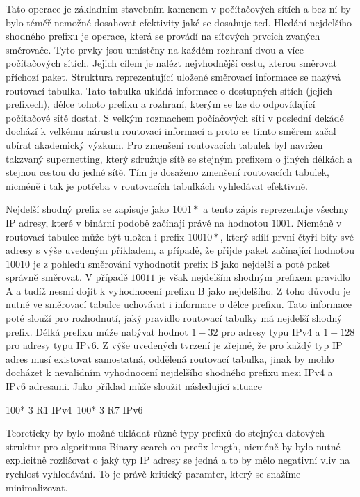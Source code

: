 Tato operace je základním stavebním kamenem v počítačových sítích a bez ní by bylo téměř nemožné dosahovat
efektivity jaké se dosahuje teď. Hledání nejdelšího shodného prefixu je operace, která se provádí
na síťových prvcích zvaných směrovače. Tyto prvky jsou umístěny na každém rozhraní dvou a více
počítačových sítích. Jejich cílem je nalézt nejvhodnější cestu, kterou směrovat příchozí paket.
Struktura reprezentující uložené směrovací informace se nazývá routovací tabulka. Tato tabulka ukládá
informace o dostupných sítích (jejich prefixech), délce tohoto prefixu a rozhraní, kterým se lze
do odpovídající počítačové sítě dostat. S velkým rozmachem počíačových sítí v poslední dekádě
dochází k velkému nárustu routovací informací a proto se tímto směrem začal ubírat akademický výzkum.
Pro zmenšení routovacích tabulek byl navržen takzvaný supernetting, který sdružuje sítě se stejným
prefixem o jiných délkách a stejnou cestou do jedné sítě. Tím je dosaženo zmenšení routovacích tabulek,
nicméně i tak je potřeba v routovacích tabulkách vyhledávat efektivně.

Nejdelší shodný prefix se zapisuje jako $1001*$ a tento zápis reprezentuje všechny IP adresy,
které v binární podobě začínají právě na hodnotou $1001$. Nicméně v routovací tabulce
může být uložen i prefix $10010*$, který sdílí první čtyři bity své adresy s výše uvedeným příkladem,
a přípaďě, že přijde paket začínající hodnotou $10010$ je z pohledu směrování vyhodnotit prefix B jako
nejdelší a poté paket správně směrovat. V případě $10011$ je však nejdelším shodným prefixem pravidlo A
a tudíž nesmí dojít k vyhodnocení prefixu B jako nejdelšího. Z toho důvodu je nutné ve směrovací tabulce
uchovávat i informace o délce prefixu. Tato informace poté slouží pro rozhodnutí, jaký pravidlo
routovací tabulky má nejdelší shodný prefix. Délká prefixu může nabývat hodnot $1-32$ pro adresy typu
IPv4 a $1-128$ pro adresy typu IPv6. Z výše uvedených tvrzení je zřejmé, že pro každý typ
IP adres musí existovat samostatná, oddělená routovací tabulka, jinak by mohlo docházet k nevalidním
vyhodnocení nejdelšího shodného prefixu mezi IPv4 a IPv6 adresami. Jako příklad může sloužit následující
situace

100* 3 R1 IPv4\
100* 3 R7 IPv6\

Teoreticky by bylo možné ukládat různé typy prefixů do stejných datových struktur pro algoritmus
Binary search on prefix length, nicméně by bylo nutné explicitně rozlišovat o jaký typ IP adresy se
jedná a to by mělo negativní vliv na rychlost vyhledávání. To je právě kritický paramter, který
se snažíme minimalizovat.

